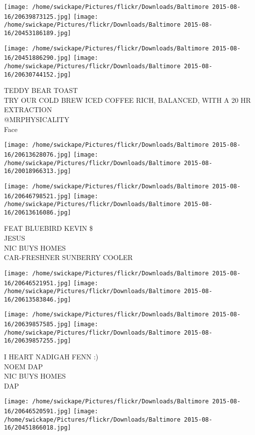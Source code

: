 \documentclass[10pt,letterpaper]{article}
\begin{document}
\texttt{[image: /home/swickape/Pictures/flickr/Downloads/Baltimore 2015-08-16/20639873125.jpg]}
\texttt{[image: /home/swickape/Pictures/flickr/Downloads/Baltimore 2015-08-16/20453186189.jpg]}

\texttt{[image: /home/swickape/Pictures/flickr/Downloads/Baltimore 2015-08-16/20451886290.jpg]}
\texttt{[image: /home/swickape/Pictures/flickr/Downloads/Baltimore 2015-08-16/20630744152.jpg]}

TEDDY BEAR TOAST\\
TRY OUR COLD BREW ICED COFFEE RICH, BALANCED, WITH A 20 HR EXTRACTION\\
@MRPHYSICALITY\\
Face\\
\pagebreak

\texttt{[image: /home/swickape/Pictures/flickr/Downloads/Baltimore 2015-08-16/20613628076.jpg]}
\texttt{[image: /home/swickape/Pictures/flickr/Downloads/Baltimore 2015-08-16/20018966313.jpg]}

\texttt{[image: /home/swickape/Pictures/flickr/Downloads/Baltimore 2015-08-16/20646798521.jpg]}
\texttt{[image: /home/swickape/Pictures/flickr/Downloads/Baltimore 2015-08-16/20613616086.jpg]}

FEAT BLUEBIRD KEVIN \$\\
JESUS\\
NIC BUYS HOMES\\
CAR{-}FRESHNER SUNBERRY COOLER\\
\pagebreak

\texttt{[image: /home/swickape/Pictures/flickr/Downloads/Baltimore 2015-08-16/20646521951.jpg]}
\texttt{[image: /home/swickape/Pictures/flickr/Downloads/Baltimore 2015-08-16/20613583846.jpg]}

\texttt{[image: /home/swickape/Pictures/flickr/Downloads/Baltimore 2015-08-16/20639857585.jpg]}
\texttt{[image: /home/swickape/Pictures/flickr/Downloads/Baltimore 2015-08-16/20639857255.jpg]}

I HEART NADIGAH FENN :)\\
NOEM DAP\\
NIC BUYS HOMES\\
DAP\\
\pagebreak

\texttt{[image: /home/swickape/Pictures/flickr/Downloads/Baltimore 2015-08-16/20646520591.jpg]}
\texttt{[image: /home/swickape/Pictures/flickr/Downloads/Baltimore 2015-08-16/20451866018.jpg]}
\end{document}
